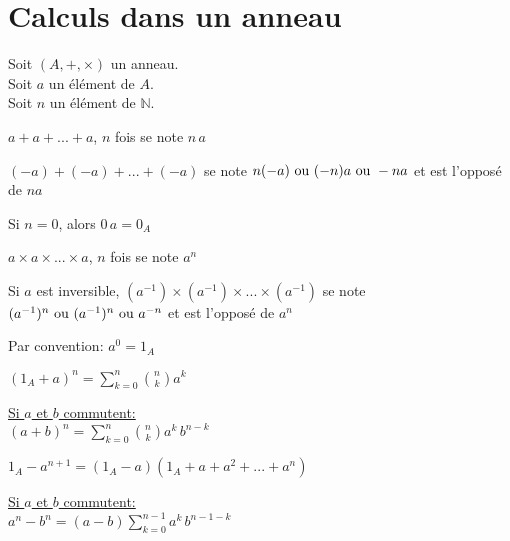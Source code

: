 \documentclass[12pt,twoside,a4paper]{article}
\begin{document}
	\section{Calculs dans un anneau}
		\begin{flushleft}
			Soit $(A,+,\times)$ un anneau.\\
			Soit $a$ un \'el\'ement de $A$.\\
			Soit $n$ un \'el\'ement de $\mathbb{N}$.
			\begin{liste}
				\item $a+a+...+a$, $n$ fois se note $n\,a$
				\item $(-a)+(-a)+...+(-a)$ se note $n(-a)\text{ ou }(-n)a\text{ ou } -na$ et est l'oppos\'e de $na$
				\item Si $n=0$, alors $0\,a=0_A$
				\item $a\times a\times...\times a$, $n$ fois se note $a^{n}$
				\item Si $a$ est inversible, $(a^{-1})\times(a^{-1})\times...\times(a^{-1})$ se note $(a^{-1})^n\text{ ou }(a^{-1})^n\text{ ou } a^{-n}$ et est l'oppos\'e de $a^n$
				\item Par convention: $a^0=1_A$
			\end{liste}
		\end{flushleft}
		\begin{prop}
			\begin{liste}
				\item $\left( 1_A+a\right) ^n=\sum\limits_{k=0}^n\binom{n}{k}a^k$
				\item \underline{Si $a$ et $b$ commutent:}\\
					$\left(a+b\right) ^n=\sum\limits_{k=0}^n\binom{n}{k}a^k\,b^{n-k}$\\
					
				\item $1_A-a^{n+1}=(1_A-a)(1_A+a+a^{2}+...+a^{n})$
				\item \underline{Si $a$ et $b$ commutent:}\\
					$a^n-b^n=(a-b)\sum\limits_{k=0}^{n-1}a^k\,b^{n-1-k}$
			\end{liste}
		\end{prop}
\end{document}
